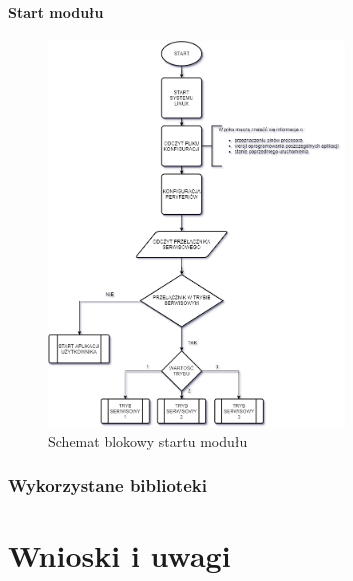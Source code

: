 \documentclass[12pt, eng, twoside, openany, final]{mgr}
\begin{document}
                    \subsubsection{Start modułu}
                        \begin{figure}[H]
                        \begin{center}
                            \includegraphics[width=0.7\textwidth]{startup.png}
                            \caption{Schemat blokowy startu modułu}
                        \end{center}
                        \end{figure}
                \subsection{Wykorzystane biblioteki}
                \subsection{}
            
\chapter{Wnioski i uwagi}
\thispagestyle{fancy}
  \cite{CleanCode,EffectiveModern,RpiBeginner}




\end{document}
